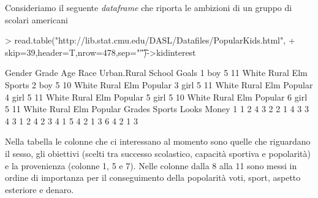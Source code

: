 \documentclass[onecolumn,12pt]{book}
\begin{document}
Consideriamo il seguente \emph{dataframe} che riporta le ambizioni di un gruppo di scolari americani
\begin{Schunk}
\begin{Sinput}
> read.table("http://lib.stat.cmu.edu/DASL/Datafiles/PopularKids.html",
+ skip=39,header=T,nrow=478,sep="\t")->kidinterest
\end{Sinput}
\end{Schunk}
\begin{Schunk}
\begin{Soutput}
  Gender Grade Age  Race Urban.Rural School   Goals
1    boy     5  11 White       Rural    Elm  Sports
2    boy     5  10 White       Rural    Elm Popular
3   girl     5  11 White       Rural    Elm Popular
4   girl     5  11 White       Rural    Elm Popular
5   girl     5  10 White       Rural    Elm Popular
6   girl     5  11 White       Rural    Elm Popular
  Grades Sports Looks Money
1      1      2     4     3
2      2      1     4     3
3      4      3     1     2
4      2      3     4     1
5      4      2     1     3
6      4      2     1     3
\end{Soutput}
\end{Schunk}
Nella tabella le colonne che ci interessano al momento sono quelle che riguardano il sesso, gli obiettivi (scelti tra successo scolastico, capacit\`a sportiva e popolarit\`a) e la provenienza (colonne 1, 5  e 7). Nelle colonne dalla 8 alla 11 sono messi in ordine di importanza per il conseguimento della popolarit\`a  voti, sport, aspetto esteriore e denaro.
\end{document}
